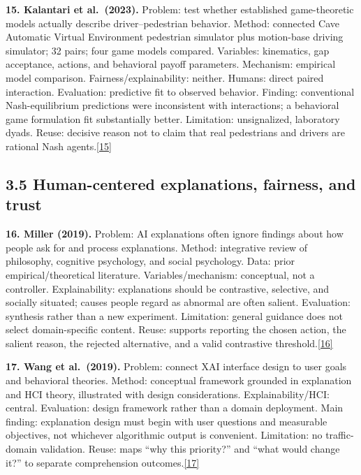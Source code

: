 \documentclass[
  english,
  11pt,
  a4paper,
]{article}
\begin{document}
\textbf{15. Kalantari et al.~(2023).} Problem: test whether established
game-theoretic models actually describe driver--pedestrian behavior.
Method: connected Cave Automatic Virtual Environment pedestrian
simulator plus motion-base driving simulator; 32 pairs; four game models
compared. Variables: kinematics, gap acceptance, actions, and behavioral
payoff parameters. Mechanism: empirical model comparison.
Fairness/explainability: neither. Humans: direct paired interaction.
Evaluation: predictive fit to observed behavior. Finding: conventional
Nash-equilibrium predictions were inconsistent with interactions; a
behavioral game formulation fit substantially better. Limitation:
unsignalized, laboratory dyads. Reuse: decisive reason not to claim that
real pedestrians and drivers are rational Nash
agents.\hyperref[source-15]{[15]}

\subsection{3.5 Human-centered explanations, fairness, and
trust}\label{human-centered-explanations-fairness-and-trust}

\textbf{16. Miller (2019).} Problem: AI explanations often ignore
findings about how people ask for and process explanations. Method:
integrative review of philosophy, cognitive psychology, and social
psychology. Data: prior empirical/theoretical literature.
Variables/mechanism: conceptual, not a controller. Explainability:
explanations should be contrastive, selective, and socially situated;
causes people regard as abnormal are often salient. Evaluation:
synthesis rather than a new experiment. Limitation: general guidance
does not select domain-specific content. Reuse: supports reporting the
chosen action, the salient reason, the rejected alternative, and a valid
contrastive threshold.\hyperref[source-16]{[16]}

\textbf{17. Wang et al.~(2019).} Problem: connect XAI interface design
to user goals and behavioral theories. Method: conceptual framework
grounded in explanation and HCI theory, illustrated with design
considerations. Explainability/HCI: central. Evaluation: design
framework rather than a domain deployment. Main finding: explanation
design must begin with user questions and measurable objectives, not
whichever algorithmic output is convenient. Limitation: no
traffic-domain validation. Reuse: maps ``why this priority?'' and ``what
would change it?'' to separate comprehension
outcomes.\hyperref[source-17]{[17]}
\end{document}
